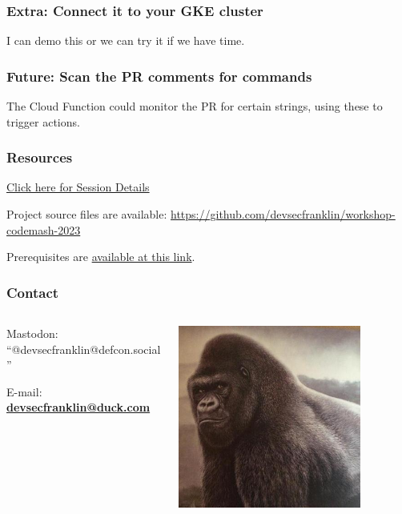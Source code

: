 \documentclass[aspectratio=169]{beamer}
\begin{document}
\begin{frame}
	\frametitle{Extra: Connect it to your GKE cluster}

	I can demo this or we can try it if we have time.

\end{frame}

\begin{frame}
	\frametitle{Future: Scan the PR comments for commands}

	The Cloud Function could monitor the PR for certain strings, using these to trigger actions.

\end{frame}

\begin{frame}
	\frametitle{Resources}
	\href{https://www.codemash.org/session-details/?id=375030}{Click here for Session Details}
	\vspace{2mm}

	Project source files are available: \url{https://github.com/devsecfranklin/workshop-codemash-2023}
	\vspace{2mm}

	Prerequisites are \href{https://prereqs.codemash.org/}{available at this link}.
\end{frame}

\begin{frame}
	\frametitle{Contact}
	\begin{columns}
		\begin{column}{0.5\textwidth}
			Mastodon: ``@devsecfranklin@defcon.social''
			\vspace{2mm}

			E-mail: \textbf{\href{mailto:devsecfranklin@duck.com}{devsecfranklin@duck.com}}
		\end{column}
		\begin{column}{0.5\textwidth}
			\begin{center}
				\includegraphics[width=0.785\textwidth]{../images/rilla.jpg}
			\end{center}
		\end{column}
	\end{columns}
\end{frame}
\end{document}
